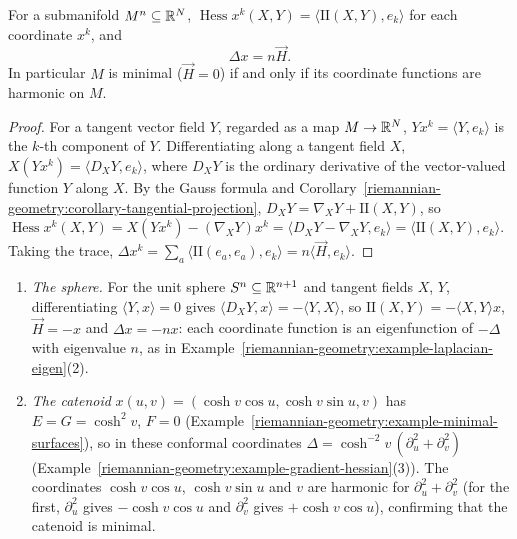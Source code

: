 \begin{proposition}\label{riemannian-geometry:proposition-beltrami-formula}
For a submanifold $M^n \subseteq \mathbb{R}^N$, $\operatorname{Hess}x^k(X, Y) = \langle\mathrm{II}(X, Y), e_k\rangle$ for each coordinate $x^k$, and
\[
\Delta x = n\vec{H} .
\]
In particular $M$ is minimal ($\vec{H} = 0$) if and only if its coordinate functions are harmonic on $M$.
\end{proposition}

\begin{proof}
For a tangent vector field $Y$, regarded as a map $M \to \mathbb{R}^N$, $Yx^k = \langle Y, e_k\rangle$ is the $k$-th component of $Y$. Differentiating along a tangent field $X$,
$X(Yx^k) = \langle D_XY, e_k\rangle$, where $D_XY$ is the ordinary derivative of the vector-valued function $Y$ along $X$. By the Gauss formula and
Corollary~\ref{riemannian-geometry:corollary-tangential-projection}, $D_XY = \nabla_XY + \mathrm{II}(X, Y)$, so
$\operatorname{Hess}x^k(X, Y) = X(Yx^k) - (\nabla_XY)x^k = \langle D_XY - \nabla_XY, e_k\rangle = \langle\mathrm{II}(X, Y), e_k\rangle$. Taking the trace,
$\Delta x^k = \sum_a\langle\mathrm{II}(e_a, e_a), e_k\rangle = n\langle\vec{H}, e_k\rangle$.
\end{proof}

\begin{example}\label{riemannian-geometry:example-beltrami-formula}
\begin{enumerate}
\item \emph{The sphere.} For the unit sphere $S^n \subseteq \mathbb{R}^{n+1}$ and tangent fields $X$, $Y$, differentiating $\langle Y, x\rangle = 0$ gives $\langle D_XY, x\rangle = -\langle Y, X\rangle$, so
$\mathrm{II}(X, Y) = -\langle X, Y\rangle x$, $\vec{H} = -x$ and $\Delta x = -nx$: each coordinate function is an eigenfunction of $-\Delta$ with eigenvalue $n$, as in
Example~\ref{riemannian-geometry:example-laplacian-eigen}(2).
\item \emph{The catenoid} $x(u, v) = (\cosh v\cos u, \cosh v\sin u, v)$ has $E = G = \cosh^2v$, $F = 0$ (Example~\ref{riemannian-geometry:example-minimal-surfaces}), so in these conformal coordinates
$\Delta = \cosh^{-2}v\,(\partial_u^2 + \partial_v^2)$ (Example~\ref{riemannian-geometry:example-gradient-hessian}(3)). The coordinates $\cosh v\cos u$, $\cosh v\sin u$ and $v$ are harmonic for
$\partial_u^2 + \partial_v^2$ (for the first, $\partial_u^2$ gives $-\cosh v\cos u$ and $\partial_v^2$ gives $+\cosh v\cos u$), confirming that the catenoid is minimal.
\end{enumerate}
\end{example}

